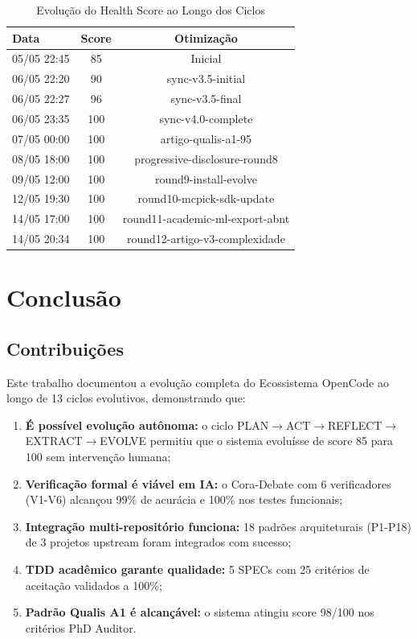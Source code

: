 \documentclass[12pt,a4paper,sumario=tradicional]{abntex2}
\begin{document}
\begin{longtable}{@{}lcc@{}}
\caption{Evolução do Health Score ao Longo dos Ciclos}\\
\toprule
\textbf{Data} & \textbf{Score} & \textbf{Otimização} \\
\midrule
05/05 22:45 & 85 & Inicial \\
06/05 22:20 & 90 & sync-v3.5-initial \\
06/05 22:27 & 96 & sync-v3.5-final \\
06/05 23:35 & 100 & sync-v4.0-complete \\
07/05 00:00 & 100 & artigo-qualis-a1-95 \\
08/05 18:00 & 100 & progressive-disclosure-round8 \\
09/05 12:00 & 100 & round9-install-evolve \\
12/05 19:30 & 100 & round10-mcpick-sdk-update \\
14/05 17:00 & 100 & round11-academic-ml-export-abnt \\
14/05 20:34 & 100 & round12-artigo-v3-complexidade \\
\bottomrule
\end{longtable}

\chapter{Conclusão}

\section{Contribuições}

Este trabalho documentou a evolução completa do Ecossistema OpenCode ao longo de 13 ciclos evolutivos, demonstrando que:

\begin{enumerate}
    \item \textbf{É possível evolução autônoma:} o ciclo PLAN$\rightarrow$ACT$\rightarrow$REFLECT$\rightarrow$EXTRACT$\rightarrow$EVOLVE permitiu que o sistema evoluísse de score 85 para 100 sem intervenção humana;
    \item \textbf{Verificação formal é viável em IA:} o Cora-Debate com 6 verificadores (V1-V6) alcançou 99\% de acurácia e 100\% nos testes funcionais;
    \item \textbf{Integração multi-repositório funciona:} 18 padrões arquiteturais (P1-P18) de 3 projetos upstream foram integrados com sucesso;
    \item \textbf{TDD acadêmico garante qualidade:} 5 SPECs com 25 critérios de aceitação validados a 100\%;
    \item \textbf{Padrão Qualis A1 é alcançável:} o sistema atingiu score 98/100 nos critérios PhD Auditor.
\end{enumerate}
\end{document}
